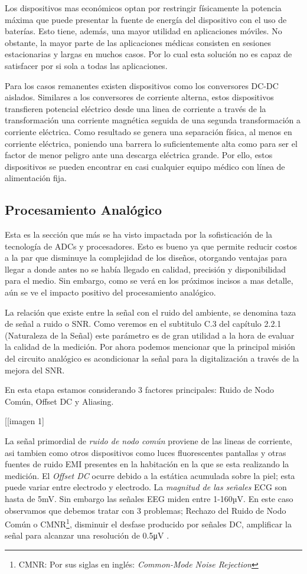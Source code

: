 Los dispositivos mas económicos optan por restringir físicamente la potencia máxima que puede presentar la fuente de energía del dispositivo con el uso de baterías. Esto tiene, además, una mayor utilidad en aplicaciones móviles. No obstante, la mayor parte de las aplicaciones médicas consisten en sesiones estacionarias y largas en muchos casos. Por lo cual esta solución no es capaz de satisfacer por si sola a todas las aplicaciones.

Para los casos remanentes existen dispositivos como los conversores DC-DC aislados. Similares a los conversores de corriente alterna, estos dispositivos transfieren potencial eléctrico desde una linea de corriente a través de la transformación una corriente magnética seguida de una segunda transformación a corriente eléctrica. Como resultado se genera una separación física, al menos en corriente eléctrica, poniendo una barrera lo suficientemente alta como para ser el factor de menor peligro ante una descarga eléctrica grande. Por ello, estos dispositivos se pueden encontrar en casi cualquier equipo médico con línea de alimentación fija.

\subsection{Procesamiento Analógico}
\label{sec:org93980db}
Esta es la sección que más se ha visto impactada por la sofisticación de la tecnología de ADCs y procesadores. Esto es bueno ya que permite reducir costos a la par que disminuye la complejidad de los diseños, otorgando ventajas para llegar a donde antes no se había llegado en calidad, precisión y disponibilidad para el medio. Sin embargo, como se verá en los próximos incisos a mas detalle, aún se ve el impacto positivo del procesamiento analógico.

La relación que existe entre la señal con el ruido del ambiente, se denomina taza de señal a ruido o SNR. Como veremos en el subtitulo C.3 del capítulo 2.2.1 (Naturaleza de la Señal) este parámetro es de gran utilidad a la hora de evaluar la calidad de la medición. Por ahora podemos mencionar que la principal misión del circuito analógico es acondicionar la señal para la digitalización a través de la mejora del SNR.

En esta etapa estamos considerando 3 factores principales: Ruido de Nodo Común, Offset DC y Aliasing.

[[imagen 1]

La señal primordial de \emph{ruido de nodo común} proviene de las lineas de corriente, asi tambien como otros dispositivos como luces fluorescentes pantallas y otras fuentes de ruido EMI presentes en la habitación en la que se esta realizando la medición. El \emph{Offset DC} ocurre debido a la estática acumulada sobre la piel; esta puede variar entre electrodo y electrodo. La \emph{magnitud de las señales} ECG son hasta de 5mV. Sin embargo las señales EEG miden entre 1-160µV. En este caso observamos que debemos tratar con 3 problemas; Rechazo del Ruido de Nodo Común o CMNR\footnote{CMNR: Por sus siglas en inglés: \emph{Common-Mode Noise Rejection}}, disminuir el desfase producido por señales DC, amplificar la señal para alcanzar una resolución de 0.5μV \cite{IFCN1999a}.

